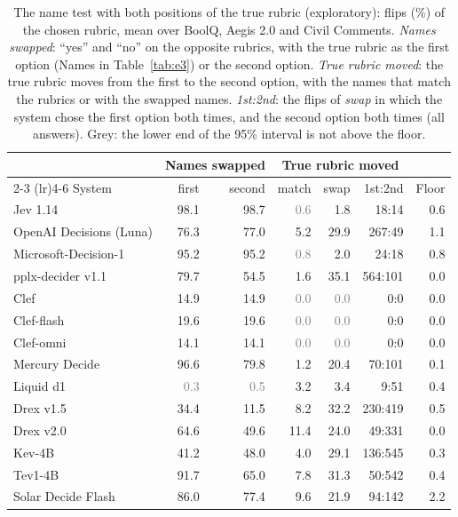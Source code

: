 \begin{table}[t]
\centering
\scriptsize
\setlength{\tabcolsep}{2.2pt}
\begin{tabular}{@{}lrrrrrr@{}}
\toprule
 & \multicolumn{2}{c}{Names swapped} & \multicolumn{3}{c}{True rubric moved} & \\
\cmidrule(lr){2-3} \cmidrule(lr){4-6}
System & first & second & match & swap & 1st:2nd & Floor \\
\midrule
Jev 1.14 & 98.1 & 98.7 & \textcolor{gray}{0.6} & 1.8 & 18:14 & 0.6 \\
OpenAI Decisions (Luna) & 76.3 & 77.0 & 5.2 & 29.9 & 267:49 & 1.1 \\
Microsoft-Decision-1 & 95.2 & 95.2 & \textcolor{gray}{0.8} & 2.0 & 24:18 & 0.8 \\
pplx-decider v1.1 & 79.7 & 54.5 & 1.6 & 35.1 & 564:101 & 0.0 \\
Clef & 14.9 & 14.9 & \textcolor{gray}{0.0} & \textcolor{gray}{0.0} & 0:0 & 0.0 \\
Clef-flash & 19.6 & 19.6 & \textcolor{gray}{0.0} & \textcolor{gray}{0.0} & 0:0 & 0.0 \\
Clef-omni & 14.1 & 14.1 & \textcolor{gray}{0.0} & \textcolor{gray}{0.0} & 0:0 & 0.0 \\
Mercury Decide & 96.6 & 79.8 & 1.2 & 20.4 & 70:101 & 0.1 \\
Liquid d1 & \textcolor{gray}{0.3} & \textcolor{gray}{0.5} & 3.2 & 3.4 & 9:51 & 0.4 \\
Drex v1.5 & 34.4 & 11.5 & 8.2 & 32.2 & 230:419 & 0.5 \\
Drex v2.0 & 64.6 & 49.6 & 11.4 & 24.0 & 49:331 & 0.0 \\
Kev-4B & 41.2 & 48.0 & 4.0 & 29.1 & 136:545 & 0.3 \\
Tev1-4B & 91.7 & 65.0 & 7.8 & 31.3 & 50:542 & 0.4 \\
Solar Decide Flash & 86.0 & 77.4 & 9.6 & 21.9 & 94:142 & 2.2 \\
\bottomrule
\end{tabular}
\caption{The name test with both positions of the true rubric (exploratory): flips (\%) of the chosen rubric, mean over BoolQ, Aegis 2.0 and Civil Comments. \emph{Names swapped}: ``yes'' and ``no'' on the opposite rubrics, with the true rubric as the first option (Names in Table~\ref{tab:e3}) or the second option. \emph{True rubric moved}: the true rubric moves from the first to the second option, with the names that match the rubrics or with the swapped names. \emph{1st:2nd}: the flips of \emph{swap} in which the system chose the first option both times, and the second option both times (all answers). Grey: the lower end of the 95\% interval is not above the floor.}
\label{tab:app-names}
\end{table}
